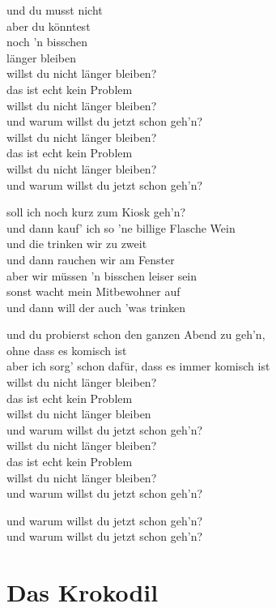 \documentclass[]{book}
\begin{document}
und du musst nicht\\
aber du könntest\\
noch 'n bisschen\\
länger bleiben\\
willst du nicht länger bleiben?\\
das ist echt kein Problem\\
willst du nicht länger bleiben?\\
und warum willst du jetzt schon geh'n?\\
willst du nicht länger bleiben?\\
das ist echt kein Problem\\
willst du nicht länger bleiben?\\
und warum willst du jetzt schon geh'n?

soll ich noch kurz zum Kiosk geh'n?\\
und dann kauf' ich so 'ne billige Flasche Wein\\
und die trinken wir zu zweit\\
und dann rauchen wir am Fenster\\
aber wir müssen 'n bisschen leiser sein\\
sonst wacht mein Mitbewohner auf\\
und dann will der auch 'was trinken

und du probierst schon den ganzen Abend zu geh'n,\\
ohne dass es komisch ist\\
aber ich sorg' schon dafür, dass es immer komisch ist\\
willst du nicht länger bleiben?\\
das ist echt kein Problem\\
willst du nicht länger bleiben\\
und warum willst du jetzt schon geh'n?\\
willst du nicht länger bleiben?\\
das ist echt kein Problem\\
willst du nicht länger bleiben?\\
und warum willst du jetzt schon geh'n?

und warum willst du jetzt schon geh'n?\\
und warum willst du jetzt schon geh'n?

\hypertarget{das-krokodil}{%
\section{Das Krokodil}\label{das-krokodil}}
\end{document}
